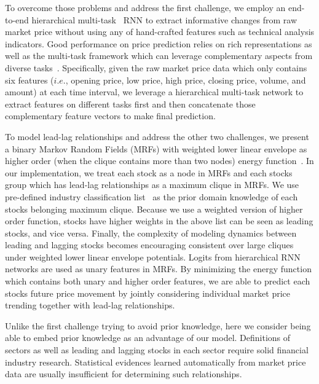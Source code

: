 \documentclass[sigconf]{acmart}
\renewcommand{\cite}{\citep}
\begin{document}
To overcome those problems and address the first challenge, we
employ an end-to-end hierarchical
multi-task~\cite{caruana1993multitask} RNN to extract informative
changes from raw market price without using any of hand-crafted
features such as technical analysis indicators. Good performance
on price prediction relies on rich representations as well as the
multi-task framework which can leverage complementary aspects
from diverse tasks~\cite{sogaard2016deep}. Specifically, given
the raw market price data which only contains six features
($i.e.$, opening price, low price, high price, closing price,
volume, and amount) at each time interval, we leverage a
hierarchical multi-task network to extract features on different
tasks first and then concatenate those complementary feature
vectors to make final prediction.

To model lead-lag relationships and address the other two
challenges, we present a binary Markov Random Fields (MRFs) with
weighted lower linear envelope as higher order (when the clique
contains more than two nodes) energy
function~\cite{Kohli:CVPR07,Nowozin:2011,Gould:ICML2011,gouldlearning}.
In our implementation, we treat each stock as a node in MRFs and
each stocks group which has lead-lag relationships as a maximum
clique in MRFs. We use pre-defined industry classification
list~\cite{ths} as the prior domain knowledge of each
stock\textquotesingle s belonging maximum clique. Because we use
a weighted version of higher order function, stocks have higher
weights in the above list can be seen as leading stocks, and vice
versa. Finally, the complexity of modeling dynamics between
leading and lagging stocks becomes encouraging consistent over
large cliques under weighted lower linear envelope potentials.
Logits from hierarchical RNN networks are used as unary features
in MRFs. By minimizing the energy function which contains both
unary and higher order features, we are able to predict each
stock\textquotesingle s future price movement by jointly
considering individual market price trending together with
lead-lag relationships.

Unlike the first challenge trying to avoid prior knowledge, here
we consider being able to embed prior knowledge as an advantage
of our model. Definitions of sectors as well as leading and
lagging stocks in each sector require solid financial industry
research. Statistical evidences learned automatically from market
price data are usually insufficient for determining such
relationships.
\end{document}
